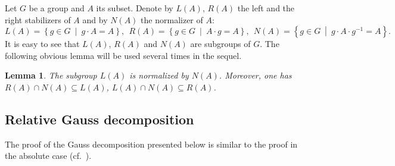 \documentclass[11pt]{amsart}
\theoremstyle{plain}
\numberwithin{equation}{section}
\newtheorem{lemma}{Lemma}
\numberwithin{lemma}{section}
\theoremstyle{definition}
\theoremstyle{remark}
\begin{document}
Let $G$ be a group and $A$ its subset. Denote by $L(A)$, $R(A)$ the left and the right stabilizers of $A$ and by $N(A)$ the normalizer of $A$:
\[ L(A) =  \left\{ g\in G\ \middle |\ g \cdot A = A \right\}\!,\ \ R(A) =  \left\{ g\in G\ \middle |\ A \cdot g = A \right\}\!,\ \ N(A) =  \left\{ g\in G\ \middle |\ g \cdot A \cdot g^{-1} = A \right\}.\]
It is easy to see that $L(A)$, $R(A)$ and $N(A)$ are subgroups of $G$. The following obvious lemma will be used several times in the sequel.
\begin{lemma} \label{lem:LN} The subgroup $L(A)$ is normalized by $N(A)$. Moreover, one has $R(A) \cap N(A) \subseteq L(A)$, $L(A) \cap N(A) \subseteq R(A)$. \end{lemma}
\begin{comment}
\begin{proof}
Let $h \in L(A)$, $g \in N(A)$. The first claim follows from the following chain of equalities:
\begin{equation} h^g \cdot A = g^{-1} \cdot h \cdot g \cdot A \cdot g^{-1} \cdot g = g^{-1} \cdot h \cdot A \cdot g = {A}^g = A. \end{equation} 
Now if $g \in R(A) \cap N(A)$, we obtain
$g \cdot A = g \cdot A \cdot g^{-1} \cdot g = A \cdot g = A,$ which implies the second claim.
\end{proof}
\end{comment}

\subsection{Relative Gauss decomposition}\label{sec:gauss}
The proof of the Gauss decomposition presented below is similar to the proof in the absolute case (cf.~\cite[Theorem~5.1]{Sm12}).
\end{document}
